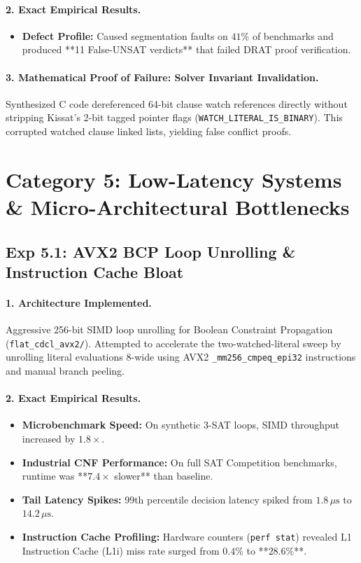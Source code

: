 \documentclass[11pt]{article}
\theoremstyle{definition}
\begin{document}
\paragraph{2. Exact Empirical Results.}
\begin{itemize}
    \item \textbf{Defect Profile:} Caused segmentation faults on $41\%$ of benchmarks and produced **11 False-UNSAT verdicts** that failed DRAT proof verification.
\end{itemize}

\paragraph{3. Mathematical Proof of Failure: Solver Invariant Invalidation.}
Synthesized C code dereferenced 64-bit clause watch references directly without stripping Kissat's 2-bit tagged pointer flags (\texttt{WATCH_LITERAL_IS_BINARY}). This corrupted watched clause linked lists, yielding false conflict proofs.

\newpage
\section{Category 5: Low-Latency Systems \& Micro-Architectural Bottlenecks}

\subsection{Exp 5.1: AVX2 BCP Loop Unrolling \& Instruction Cache Bloat}
\paragraph{1. Architecture Implemented.}
Aggressive 256-bit SIMD loop unrolling for Boolean Constraint Propagation (\texttt{flat_cdcl_avx2/}). Attempted to accelerate the two-watched-literal sweep by unrolling literal evaluations 8-wide using AVX2 \texttt{\_mm256\_cmpeq\_epi32} instructions and manual branch peeling.

\paragraph{2. Exact Empirical Results.}
\begin{itemize}
    \item \textbf{Microbenchmark Speed:} On synthetic 3-SAT loops, SIMD throughput increased by $1.8\times$.
    \item \textbf{Industrial CNF Performance:} On full SAT Competition benchmarks, runtime was **$7.4\times$ slower** than baseline.
    \item \textbf{Tail Latency Spikes:} 99th percentile decision latency spiked from $1.8\,\mu\text{s}$ to $14.2\,\mu\text{s}$.
    \item \textbf{Instruction Cache Profiling:} Hardware counters (\texttt{perf stat}) revealed L1 Instruction Cache (L1i) miss rate surged from $0.4\%$ to **$28.6\%$**.
\end{itemize}
\end{document}
